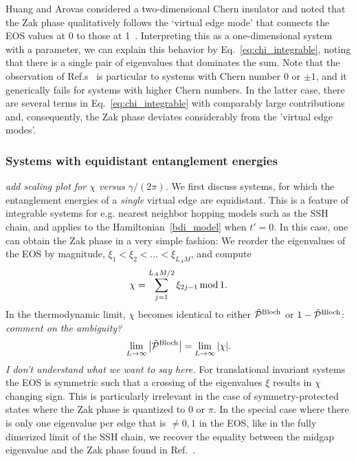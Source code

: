 \documentclass[twocolumn,amsmath,longbibliography,amssymb,superscriptaddress]{revtex4-1}
\newcommand{\mariac}[1]{{\it\color{cyan}#1}}
\begin{document}
Huang and Arovas considered a two-dimensional Chern insulator and noted that the Zak phase qualitatively follows the `virtual edge mode' that connects the EOS values at 0 to those at 1~\cite{Huang2012,Huang2012-2}. 
Interpreting this as a one-dimensional system with a parameter, we can explain this behavior by Eq.~\eqref{eq:chi_integrable}, noting that there is a single pair of eigenvalues that dominates the sum. 
Note that the observation of Ref.s~\cite{Huang2012,Huang2012-2} is particular to systems with Chern number 0 or $\pm 1$, and it generically fails for systems with higher Chern numbers. 
In the latter case, there are several terms in Eq.~\eqref{eq:chi_integrable} with comparably large contributions and, consequently, the Zak phase deviates considerably from the 'virtual edge modes'. 


\subsubsection{Systems with equidistant entanglement energies}
\mariac{add scaling plot for $\chi$ versus $\gamma/(2\pi)$. }
We first discuss systems, for which the entanglement energies of a \emph{single} virtual edge are equidistant. This is a feature of integrable systems \cite{Peschel1999} for e.g. nearest neighbor hopping models such as the SSH chain, and applies to the Hamiltonian~\eqref{bdi_model} when $t'=0$. 
In this case, one can obtain the Zak phase in a very simple fashion: We reorder the eigenvalues of the EOS by magnitude, $\xi_1 < \xi_2 < ...< \xi_{L_AM}$, and compute
\begin{equation}
\chi = \sum_{j=1}^{L_A M/2} \xi_{2j-1} \, {\rm mod} \, 1.
\label{eq:chi_integrable}
\end{equation}
In the thermodynamic limit, $\chi$ becomes identical to either $\tilde{\mathcal{P}}^{\rm Bloch}$ or $1-\tilde{\mathcal{P}}^{\rm Bloch}$: \mariac{comment on the ambiguity?}
\begin{equation}
\lim_{L \rightarrow \infty} \abs{\tilde{\mathcal{P}}^{\rm Bloch}} = \lim_{L \rightarrow \infty} \abs{\chi}.
\end{equation}
\mariac{I don't understand what we want to say here.} For translational invariant systems the EOS is symmetric such that a crossing of the eigenvalues $\xi$ results in $\chi$ changing sign. This is particularly irrelevant in the case of symmetry-protected states where the Zak phase is quantized to $0$ or $\pi$. 
In the special case where there is only one eigenvalue per edge that is $\neq 0,1$ in  the EOS, like in the fully dimerized limit of the SSH chain, we recover the equality between the midgap eigenvalue and the Zak phase found in Ref.~\cite{Ryu2006}. 
\end{document}
